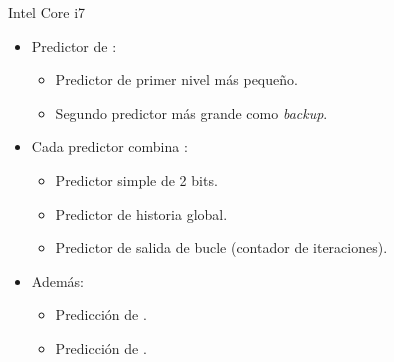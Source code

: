 \begin{frame}[t]{Intel Core i7}
\begin{itemize}
  \item Predictor de :
    \begin{itemize}
      \item Predictor de primer nivel más pequeño.
      \item Segundo predictor más grande como \emph{backup}.
    \end{itemize}

  \item Cada predictor combina :
    \begin{itemize}
      \item Predictor simple de 2 bits.
      \item Predictor de historia global.
      \item Predictor de salida de bucle (contador de iteraciones).
    \end{itemize}

  \item Además:
    \begin{itemize}
      \item Predicción de .
      \item Predicción de .
    \end{itemize}
\end{itemize}
\end{frame}
